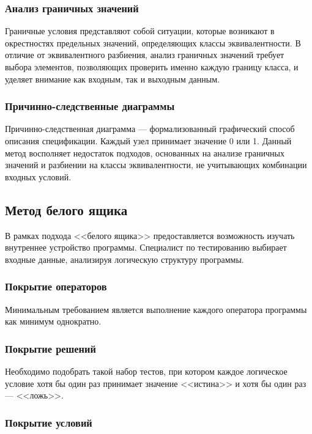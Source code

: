 \documentclass{article}[14pt]
\begin{document}
\subsubsection{Анализ граничных значений}

Граничные условия представляют собой ситуации, которые возникают в окрестностях предельных значений, определяющих 
классы эквивалентности. В отличие от эквивалентного разбиения, анализ граничных значений требует выбора элементов, 
позволяющих проверить именно каждую границу класса, и уделяет внимание как входным, так и выходным данным.

\subsubsection{Причинно-следственные диаграммы}

Причинно-следственная диаграмма --- формализованный графический способ описания спецификации. Каждый узел принимает 
значение 0 или 1. Данный метод восполняет недостаток подходов, основанных на анализе граничных значений и разбиении 
на классы эквивалентности, не учитывающих комбинации входных условий.

\subsection{Метод белого ящика}

В рамках подхода <<белого ящика>> предоставляется возможность изучать внутреннее устройство программы. 
Специалист по тестированию выбирает входные данные, анализируя логическую структуру программы.

\subsubsection{Покрытие операторов}

Минимальным требованием является выполнение каждого оператора программы как минимум однократно.

\subsubsection{Покрытие решений}

Необходимо подобрать такой набор тестов, при котором каждое логическое условие хотя бы один раз принимает 
значение <<истина>> и хотя бы один раз --- <<ложь>>.

\subsubsection{Покрытие условий}
\end{document}
